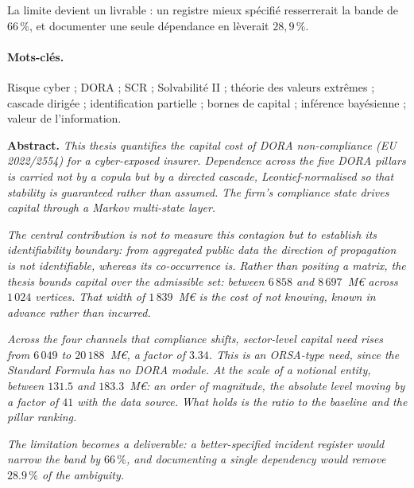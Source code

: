La limite devient un livrable : un registre mieux spécifié resserrerait la bande de $66\,\%$, et
documenter une seule dépendance en lèverait $28{,}9\,\%$.

\paragraph{Mots-clés.} Risque cyber ; DORA ; SCR ; Solvabilité II ; théorie des valeurs
extrêmes ; cascade dirigée ; identification partielle ; bornes de capital ; inférence
bayésienne ; valeur de l'information.

\bigskip
\noindent\textbf{Abstract.} \emph{This thesis quantifies the capital cost of DORA non-compliance
(EU 2022/2554) for a cyber-exposed insurer. Dependence across the five DORA pillars is carried
not by a copula but by a directed cascade, Leontief-normalised so that stability is
\emph{guaranteed} rather than assumed. The firm's compliance state drives capital through a
Markov multi-state layer.}

\emph{The central contribution is not to \emph{measure} this contagion but to establish its
\emph{identifiability boundary}: from aggregated public data the \emph{direction} of propagation
is not identifiable, whereas its \emph{co-occurrence} is. Rather than positing a matrix, the
thesis bounds capital over the admissible set: between $6\,858$ and $8\,697$~M\euro{} across
$1\,024$ vertices. That width of $1\,839$~M\euro{} is the cost of not knowing, known in advance
rather than incurred.}

\emph{Across the four channels that compliance shifts, sector-level capital need rises from
$6\,049$ to $20\,188$~M\euro, a factor of $3.34$. This is an ORSA-type need, since the Standard
Formula has no DORA module. At the scale of a notional entity, between $131.5$ and
$183.3$~M\euro{}: an order of magnitude, the absolute level moving by a factor of $41$ with the
data source. What holds is the ratio to the baseline and the pillar ranking.}

\emph{The limitation becomes a deliverable: a better-specified incident register would narrow the
band by $66\,\%$, and documenting a single dependency would remove $28.9\,\%$ of the ambiguity.}

